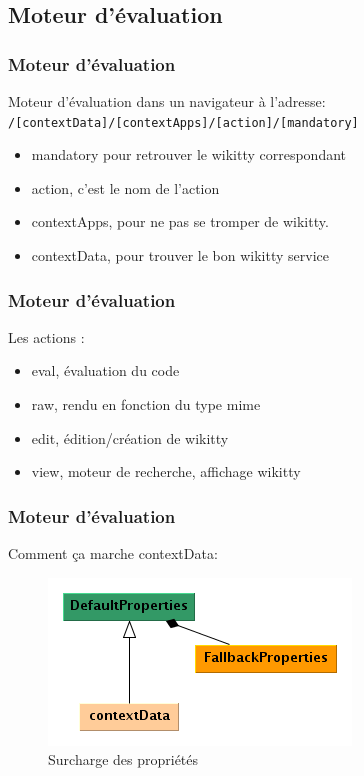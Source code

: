 \documentclass[12pt,a4paper,utf8x]{beamer}
\begin{document}
\subsection*{Moteur d'évaluation}
\begin{frame}\frametitle{Moteur d'évaluation}

Moteur d'évaluation dans un navigateur à l'adresse:\\
\verb!/[contextData]/[contextApps]/[action]/[mandatory]!

\begin{itemize}
\item mandatory pour retrouver le wikitty correspondant
\item action, c'est le nom de l'action
\item contextApps, pour ne pas se tromper de wikitty.
\item contextData, pour trouver le bon wikitty service
\end{itemize}



\end{frame}
\begin{frame}\frametitle{Moteur d'évaluation}
Les actions :
\begin{itemize}
\item eval, évaluation du code
\item raw, rendu en fonction du type mime
\item edit, édition/création de wikitty
\item view, moteur de recherche, affichage wikitty
\end{itemize}



\end{frame}


\begin{frame}\frametitle{Moteur d'évaluation}

Comment ça marche contextData:

\begin{figure}
\includegraphics[scale=0.5]{../image/propertiescontext.png} 
\caption{Surcharge des propriétés}
\end{figure}

\end{frame}
\end{document}
